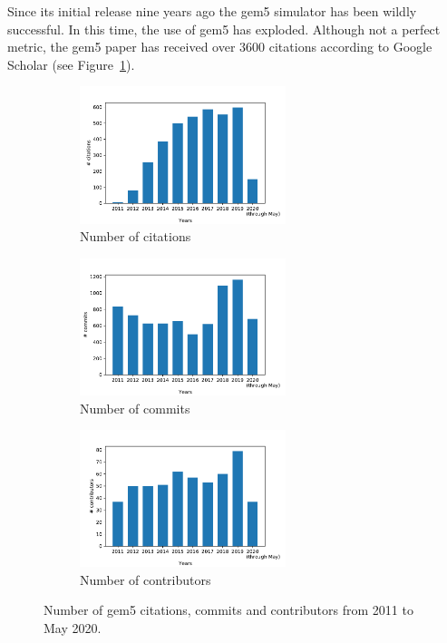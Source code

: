 Since its initial release nine years ago the gem5 simulator has been wildly successful.
In this time, the use of gem5 has exploded.
Although not a perfect metric, the gem5 paper has received over 3600 citations according to Google Scholar (see Figure~\ref{fig:citations}).

\begin{figure}
    \centering
    \begin{subfigure}{0.28\linewidth}
      \centering
      \includegraphics[height=4cm]{fig/gem5_citations}
      \caption{Number of citations}
      \label{fig:citations}
    \end{subfigure}
    \begin{subfigure}{0.28\linewidth}
      \centering
      \includegraphics[height=4cm]{fig/gem5_commits}
      \caption{Number of commits}
      \label{fig:commits}
    \end{subfigure}
    \begin{subfigure}{0.28\linewidth}
      \centering
      \includegraphics[height=4cm]{fig/gem5_contributors}
      \caption{Number of contributors}
      \label{fig:contributors}
    \end{subfigure}
    \caption{Number of gem5 citations, commits and contributors from 2011 to May 2020.}
    \label{fig:gem5_citations_commits_contributors}
\end{figure}

